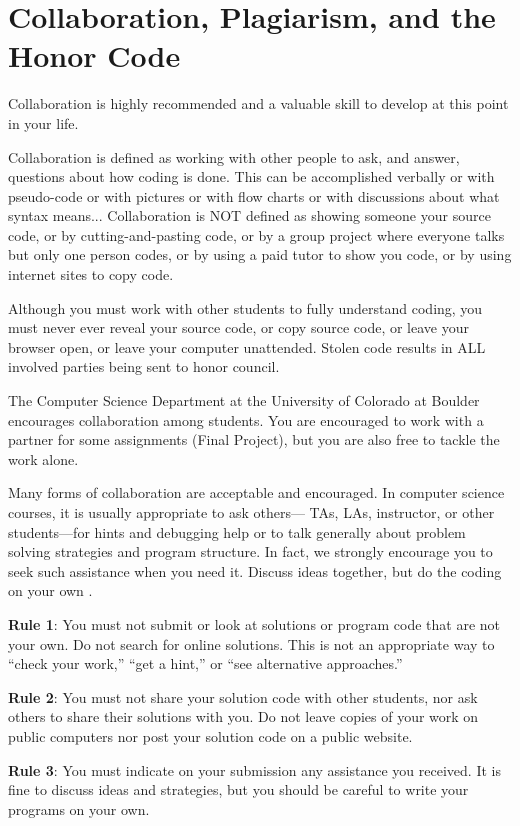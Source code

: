 \section{Collaboration, Plagiarism, and the Honor Code}

Collaboration is highly recommended and a valuable skill to develop at this point in your life.

Collaboration is defined as working with other people to ask, and answer, questions about how coding is done. This can be accomplished verbally or with pseudo-code or with pictures or with flow charts or with discussions about what syntax means... Collaboration is NOT defined as showing someone your source code, or by cutting-and-pasting code, or by a group project where everyone talks but only one person codes, or by using a paid tutor to show you code, or by using internet sites to copy code.

Although you must work with other students to fully understand coding, you must never ever reveal your source code, or copy source code, or leave your browser open, or leave your computer unattended. Stolen code results in ALL involved parties being sent to honor council.

The Computer Science Department at the University of Colorado at Boulder encourages collaboration among students. You are encouraged to work with a partner for some assignments (Final Project), but you are also free to tackle the work alone.

Many forms of collaboration are acceptable and encouraged. In computer science courses, it is usually appropriate to ask others— TAs, LAs, instructor, or other students—for hints and debugging help or to talk generally about problem solving strategies and program structure. In fact, we strongly encourage you to seek such assistance when you need it. Discuss ideas together, but do the coding on your own .

\textbf{Rule 1}: You must not submit or look at solutions or program code that are not your own. Do not search for online solutions. This is not an appropriate way to “check your work,” “get a hint,” or “see alternative approaches.”

\textbf{Rule 2}: You must not share your solution code with other students, nor ask others to share their solutions with you. Do not leave copies of your work on public computers nor post your solution code on a public website.

\textbf{Rule 3}: You must indicate on your submission any assistance you received. It is fine to discuss ideas and strategies, but you should be careful to write your programs on your own.

